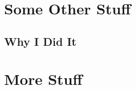 
\appendix

\chapter{Some Other Stuff}
\label{app:app1}

\section{Why I Did It}
\label{sec:why3}

\chapter{More Stuff}
\label{app:app2}

